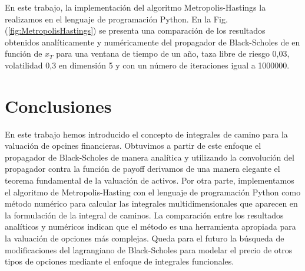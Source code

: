\documentclass[11pt,a4paper]{article}
\begin{document}
En este trabajo, la implementación del algoritmo Metropolis-Hastings la realizamos en el lenguaje de programación Python. En la Fig. (\ref{fig:MetropolisHastings}) se presenta una comparación de los resultados obtenidos anal\'iticamente y num\'ericamente del propagador de Black-Scholes de en función de $x_T$ para una ventana de tiempo de un a\~no, taza libre de riesgo 0,03, volatilidad 0,3 en dimensión 5 y con un número de iteraciones igual a 1000000.

\section{Conclusiones}

En este trabajo hemos introducido el concepto de integrales de camino para la valuaci\'on de opcines financieras. Obtuvimos a partir de este enfoque el propagador de Black-Scholes de manera anal\'itica y utilizando la convoluci\'on del propagador contra la funci\'on de payoff derivamos de una manera elegante el teorema fundamental de la valuaci\'on de activos. Por otra parte, implementamos el algoritmo de Metropolis-Hasting con el lenguaje de programaci\'on Python como m\'etodo num\'erico para calcular las integrales multidimensionales que aparecen en la formulaci\'on de la integral de caminos. La comparaci\'on entre los resultados anal\'iticos y num\'ericos indican que el m\'etodo es una herramienta apropiada para la valuaci\'on de opciones m\'as complejas. Queda para el futuro la b\'usqueda de modificaciones del lagrangiano de Black-Scholes para modelar el precio de otros tipos de opciones mediante el enfoque de integrales funcionales. 







\end{document}
